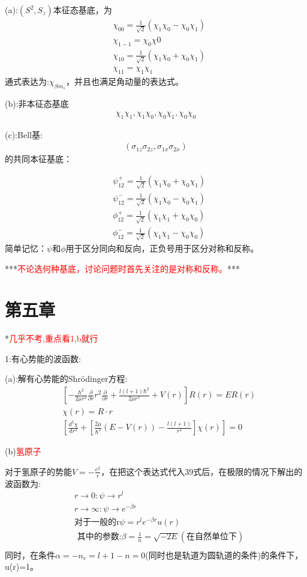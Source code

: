 \documentclass[10pt,journal,compsoc]{IEEEtran}
\begin{document}
(a):$(S^2,S_z) $本征态基底，为\begin{align}
&  \chi_{00}=\frac1{\sqrt{2}}(\chi_1\chi_0-\chi_0\chi_1)\\
&  \chi_{1-1}=\chi_0\chi0\\
&  \chi_{10}=\frac1{\sqrt{2}}(\chi_1\chi_0+\chi_0\chi_1)\\
&  \chi_{11}=\chi_1\chi_1
\end{align}
通式表达为:$\chi_{Sm_s}$，并且也满足角动量的表达式。

(b):非本征态基底\begin{align}
\chi_1\chi_1,\chi_1\chi_0,\chi_0\chi_1,\chi_0\chi_0
\end{align}

(c):Bell基:\begin{align}
  (\sigma_{1z}\sigma_{2z},\sigma_{1x}\sigma_{2x})
\end{align}的共同本征基底：

\begin{align}
  & \psi^+_{12}=\frac1{\sqrt{2}}(\chi_1\chi_0+\chi_0\chi_1)\\
  &\psi^-_{12}=\frac1{\sqrt{2}}(\chi_1\chi_0-\chi_0\chi_1) \\
  &\phi^+_{12}=\frac1{\sqrt{2}}(\chi_1\chi_1+\chi_0\chi_0) \\
  &\phi^-_{12}=\frac1{\sqrt{2}}(\chi_1\chi_1-\chi_0\chi_0)
\end{align}简单记忆：$\psi$和$\phi$用于区分同向和反向，正负号用于区分对称和反称。

***\textcolor{red}{不论选何种基底，讨论问题时首先关注的是对称和反称。}***

\section{第五章}
*\textcolor{red}{几乎不考,重点看1,b就行}

1:有心势能的波函数:

(a):解有心势能的Shr\"odinger方程:
\begin{align}
  &[-\frac{\hbar^2}{2\mu r^2}\frac{ \partial }{ \partial r}r^2\frac{ \partial }{ \partial r}+\frac{l(l+1)\hbar^2}{2\mu r^2}+V(r)]R(r)=ER(r)\\
  & \chi(r)=R\cdot r\\
  &[\frac{d^2\chi}{dr^2}+[\frac{2\mu}{\hbar^2}(E-V(r))-\frac{l(l+1)}{r^2}]\chi(r)]=0
\end{align}

(b)\textcolor{red}{氢原子}

对于氢原子的势能$V=-\frac{e^2}{r}$，在把这个表达式代入39式后，在极限的情况下解出的波函数为:
\begin{align}
  & r\rightarrow 0 :\psi \rightarrow r^l\\
  & r \rightarrow \infty :\psi \rightarrow e^{-\beta r}\\
  &\text{对于一般的r} \psi = r^le^{-\beta r}u(r)\\
  &\text{ 其中的参数:}\beta=\frac1n=\sqrt{-2E}(\text{在自然单位下})\\
\end{align}
同时，在条件$\alpha=-n_r=l+1-n=0$(同时也是轨道为圆轨道的条件)的条件下，u(r)=1。
\end{document}
